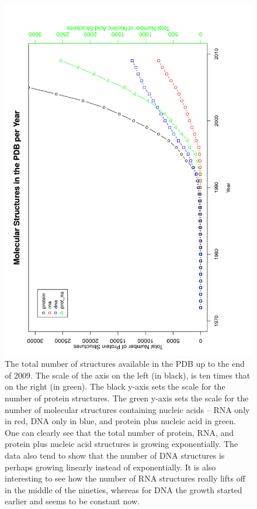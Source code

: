 \begin{figure}
\centering
\includegraphics[angle=0, scale=0.3]{Chapter2/allmolecules_per_year.png}
\caption{The total number of structures available in the PDB up to the
  end of 2009.  The  scale of the axis on the left  (in black), is ten
  times that on the right (in  green). The black y-axis sets the scale
  for the  number of  protein structures.  The  green y-axis  sets the
  scale  for the  number  of molecular  structures containing  nucleic
  acids -- RNA only in red, DNA only in blue, and protein plus nucleic
  acid in  green.   One can  clearly see that  the total  number of
  protein, RNA,  and protein plus  nucleic acid structures  is growing
  exponentially.  The  data also tend to  show that the  number of DNA
  structures is perhaps growing linearly instead of exponentially.  It
  is also interesting  to see how the number  of RNA structures really
  lifts off in the middle of  the nineties, whereas for DNA the growth
  started earlier and seems to be constant now.}
\label{fig:allpolypdb}
\end{figure}

